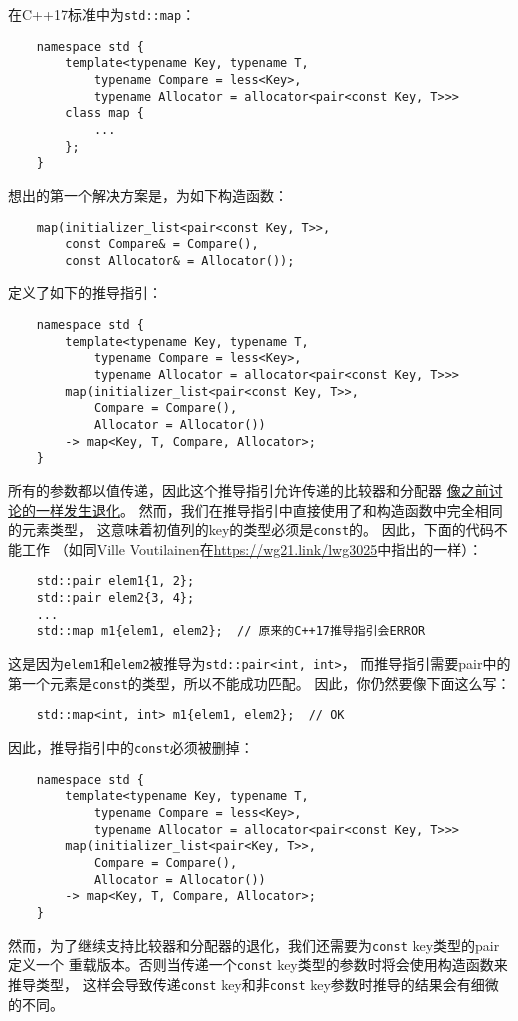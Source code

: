 在C++17标准中为\texttt{std::map}：
\begin{lstlisting}
    namespace std {
        template<typename Key, typename T,
            typename Compare = less<Key>,
            typename Allocator = allocator<pair<const Key, T>>>
        class map {
            ...
        };
    }
\end{lstlisting}
想出的第一个解决方案是，为如下构造函数：
\begin{lstlisting}
    map(initializer_list<pair<const Key, T>>,
        const Compare& = Compare(),
        const Allocator& = Allocator());
\end{lstlisting}
定义了如下的推导指引：
\begin{lstlisting}
    namespace std {
        template<typename Key, typename T,
            typename Compare = less<Key>,
            typename Allocator = allocator<pair<const Key, T>>>
        map(initializer_list<pair<const Key, T>>,
            Compare = Compare(),
            Allocator = Allocator())
        -> map<Key, T, Compare, Allocator>;
    }
\end{lstlisting}
所有的参数都以值传递，因此这个推导指引允许传递的比较器和分配器
\hyperref[ch9.2.1]{像之前讨论的一样发生退化}。
然而，我们在推导指引中直接使用了和构造函数中完全相同的元素类型，
这意味着初值列的key的类型必须是\texttt{const}的。
因此，下面的代码不能工作
（如同Ville Voutilainen在\url{https://wg21.link/lwg3025}中指出的一样）：
\begin{lstlisting}
    std::pair elem1{1, 2};
    std::pair elem2{3, 4};
    ...
    std::map m1{elem1, elem2};  // 原来的C++17推导指引会ERROR
\end{lstlisting}
这是因为\texttt{elem1}和\texttt{elem2}被推导为\texttt{std::pair<int, int>}，
而推导指引需要pair中的第一个元素是\texttt{const}的类型，所以不能成功匹配。
因此，你仍然要像下面这么写：
\begin{lstlisting}
    std::map<int, int> m1{elem1, elem2};  // OK
\end{lstlisting}
因此，推导指引中的\texttt{const}必须被删掉：
\begin{lstlisting}
    namespace std {
        template<typename Key, typename T,
            typename Compare = less<Key>,
            typename Allocator = allocator<pair<const Key, T>>>
        map(initializer_list<pair<Key, T>>,
            Compare = Compare(),
            Allocator = Allocator())
        -> map<Key, T, Compare, Allocator>;
    }
\end{lstlisting}
然而，为了继续支持比较器和分配器的退化，我们还需要为\texttt{const} key类型的pair定义一个
重载版本。否则当传递一个\texttt{const} key类型的参数时将会使用构造函数来推导类型，
这样会导致传递\texttt{const} key和非\texttt{const} key参数时推导的结果会有细微的不同。

